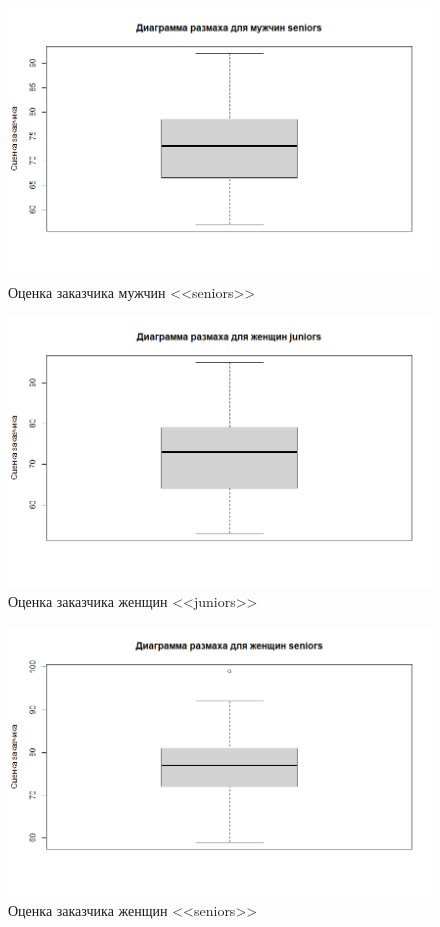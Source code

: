 \begin{figure}[H]
	\centering
	\includegraphics[width=\linewidth]{figboxms}
	\caption{Оценка заказчика мужчин <<seniors>>}
\end{figure}

\begin{figure}[H]
	\centering
	\includegraphics[width=\linewidth]{figboxwj}
	\caption{Оценка заказчика женщин <<juniors>>}
\end{figure}

\begin{figure}[H]
	\centering
	\includegraphics[width=\linewidth]{figboxws}
	\caption{Оценка заказчика женщин <<seniors>>}
\end{figure}





